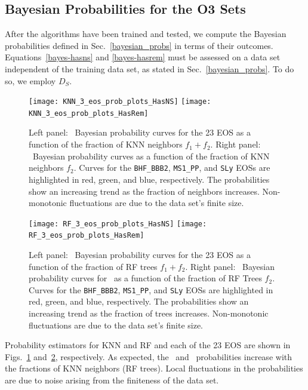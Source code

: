 \subsection{Bayesian Probabilities for the \ac{O3} Sets}

After the algorithms have been trained and tested, we compute the Bayesian probabilities defined in Sec.~\ref{bayesian_probs} in terms of their outcomes. Equations~\eqref{bayes-hasns} and \eqref{bayes-hasrem} must be assessed on a data set independent of the training data set, as stated in Sec.~\ref{bayesian_probs}. To do so, we employ $D_S$.

\begin{figure}%
\texttt{[image: KNN\_3\_eos\_prob\_plots\_HasNS]}
\texttt{[image: KNN\_3\_eos\_prob\_plots\_HasRem]}
\caption{Left panel: \hasns\ Bayesian probability curves for the 23 \ac{EOS} as a function of the fraction of \ac{KNN} neighbors $f_1+f_2$. Right panel: \hasrem\ Bayesian probability curves as a function of the fraction of \ac{KNN} neighbors $f_2$. Curves for the {\tt BHF\_BBB2}, {\tt MS1\_PP}, and {\tt SLy} \ac{EOS}s are highlighted in red, green, and blue, respectively. The probabilities show an increasing trend as the fraction of neighbors increases. Non-monotonic fluctuations are due to the data set's finite size.}
\label{fig:bayesian_prob_fits_KNN}
\end{figure}

\begin{figure}%
\texttt{[image: RF\_3\_eos\_prob\_plots\_HasNS]}
\texttt{[image: RF\_3\_eos\_prob\_plots\_HasRem]}
\caption{Left panel: \hasns\ Bayesian probability curves for the 23 \ac{EOS} as a function of the fraction of \ac{RF} trees $f_1+f_2$. Right panel: \hasrem\ Bayesian probability curves for \hasrem\ as a function of the fraction of \ac{RF} Trees $f_2$. Curves for the {\tt BHF\_BBB2}, {\tt MS1\_PP}, and {\tt SLy} \ac{EOS}s are highlighted in red, green, and blue, respectively. The probabilities show an increasing trend as the fraction of trees increases.  Non-monotonic fluctuations are due to the data set's finite size.}
\label{fig:bayesian_prob_fits_RF}
\end{figure}

Probability estimators for \ac{KNN} and \ac{RF} and each of the 23 \ac{EOS} are shown in Figs.~\ref{fig:bayesian_prob_fits_KNN} and~\ref{fig:bayesian_prob_fits_RF},
respectively. As expected, the \hasns\ and \hasrem\ probabilities increase with the fractions of \ac{KNN} neighbors (\ac{RF} trees). Local fluctuations in the probabilities are due to noise
arising from the finiteness of the data set. 

